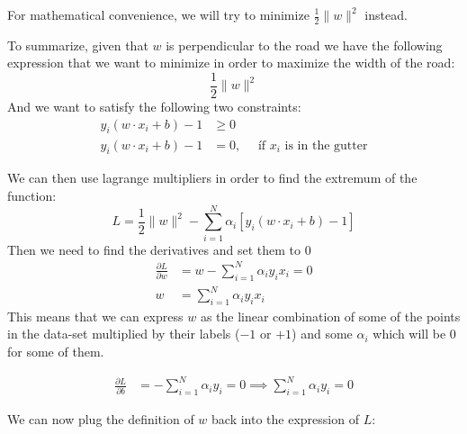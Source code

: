     For mathematical convenience, we will try to minimize $\frac{1}{2}\|w\|^2$ 
    instead.
    
    To summarize, given that $w$ is perpendicular to the road we have the 
    following expression that we want to minimize in order to maximize the 
    width of the road:
    \begin{equation*}
        \frac{1}{2}\|w\|^2
    \end{equation*} 
    And we want to satisfy the following two constraints:
    \begin{align*}
        y_i (w \cdot x_i + b) - 1 &\geq 0\\
        y_i (w \cdot x_i + b) - 1 &=0, \quad \text{ íf $x_i$ is in the gutter}
    \end{align*}
    
    We can then use lagrange multipliers in order to find the extremum of the 
    function:
    \begin{equation*}
        L = \frac{1}{2} \|w\|^2 - \sum_{i=1}^{N} \alpha_i \left[y_i(w \cdot x_i 
        + 
        b) - 1\right]
    \end{equation*}
    Then we need to find the derivatives and set them to $0$
    \begin{align*}
        \frac{\partial L}{\partial w} &= w - \sum_{i=1}^{N} \alpha_i y_i x_i = 
        0\\
        w &= \sum_{i=1}^{N}\alpha_i y_i x_i
    \end{align*}
    This means that we can express $w$ as the linear combination of some of the 
    points in the data-set multiplied by their labels ($-1$ or $+1$) and some 
    $\alpha_i$ which will be $0$ for some of them.
    
    \begin{align*}
    \frac{\partial L}{\partial b} &= -\sum_{i=1}^{N} \alpha_i y_i = 0 \implies 
    \sum_{i=1}^{N} \alpha_i y_i = 0
    \end{align*}
    
    We can now plug the definition of $w$ back into the expression of $L$:
    
